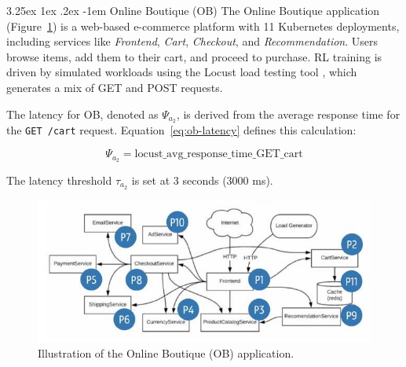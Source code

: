 \documentclass[conference]{IEEEtran}
\makeatletter
\renewcommand\paragraph{\@startsection{paragraph}{5}{\z@}%
  {3.25ex \@plus1ex \@minus.2ex}%
  {-1em}%
  {\normalfont\normalsize\bfseries}}
\makeatother
\begin{document}
\paragraph{Online Boutique (OB)}
The Online Boutique application (Figure~\ref{fig:online-boutique}) is a web-based e-commerce platform with 11 Kubernetes deployments, including services like \textit{Frontend}, \textit{Cart}, \textit{Checkout}, and \textit{Recommendation}. Users browse items, add them to their cart, and proceed to purchase. RL training is driven by simulated workloads using the Locust load testing tool \cite{locust}, which generates a mix of GET and POST requests.

The latency for OB, denoted as $\Psi_{a_2}$, is derived from the average response time for the \texttt{GET /cart} request. Equation~\ref{eq:ob-latency} defines this calculation:

\begin{equation}
    \Psi_{a_2} = \text{locust\_avg\_response\_time\_GET\_cart}
    \label{eq:ob-latency}
\end{equation}

The latency threshold $\tau_{a_2}$ is set at 3 seconds (3000 ms).

\begin{figure}[h]
    \centering
    \includegraphics[width=0.8\linewidth]{images/2024_11_17_21ad14b6196e5740bf69g-6}
    \caption{Illustration of the Online Boutique (OB) application.}
    \label{fig:online-boutique}
\end{figure}
\end{document}
